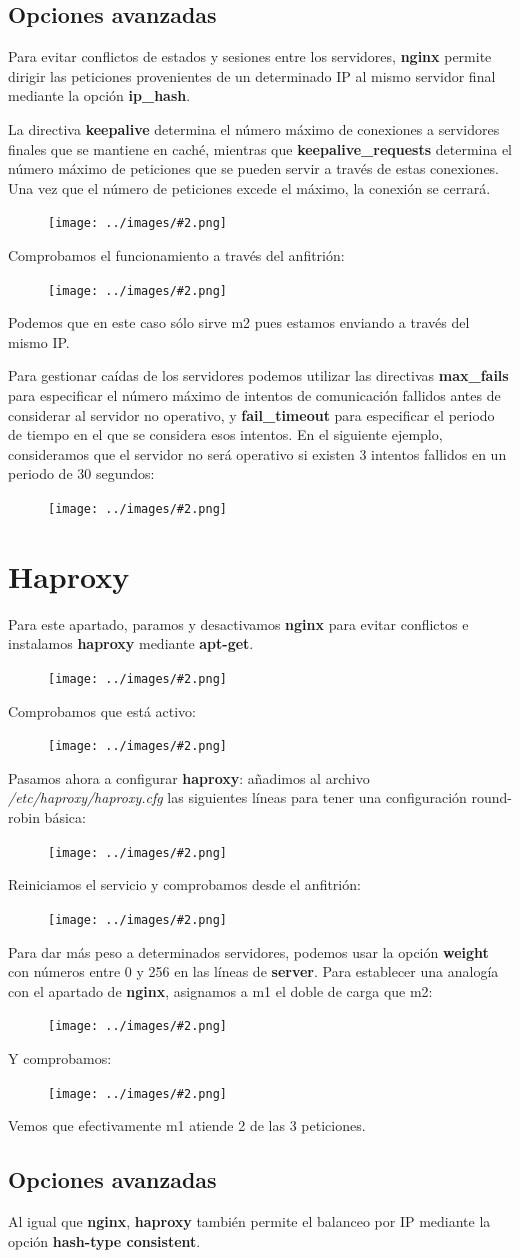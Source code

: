 \documentclass[twoside]{article}
\newcommand{\image}[2]{
\begin{figure}[H]
    \texttt{[image: ../images/\#2.png]}
    \centering
\end{figure}
}
\begin{document}
\subsection{Opciones avanzadas}
Para evitar conflictos de estados y sesiones entre los servidores, \textbf{nginx} permite dirigir las peticiones provenientes de un determinado IP al mismo servidor final mediante la opción \textbf{ip\_hash}. 

La directiva \textbf{keepalive} determina el número máximo de conexiones a servidores finales que se mantiene en caché, mientras que \textbf{keepalive\_requests} determina el número máximo de peticiones que se pueden servir a través de estas conexiones. Una vez que el número de peticiones excede el máximo, la conexión se cerrará.
\image{8}{12}
Comprobamos el funcionamiento a través del anfitrión:
\image{8}{13}
Podemos que en este caso sólo sirve m2 pues estamos enviando a través del mismo IP.

Para gestionar caídas de los servidores podemos utilizar las directivas \textbf{max\_fails} para especificar el número máximo de intentos de comunicación fallidos antes de considerar al servidor no operativo, y \textbf{fail\_timeout} para especificar el periodo de tiempo en el que se considera esos intentos. En el siguiente ejemplo, consideramos que el servidor no será operativo si existen 3 intentos fallidos en un periodo de 30 segundos:
\image{8}{14}


\section{Haproxy}
Para este apartado, paramos y desactivamos \textbf{nginx} para evitar conflictos e instalamos \textbf{haproxy} mediante \textbf{apt-get}.
\image{8}{15}
Comprobamos que está activo:
\image{8}{16}
Pasamos ahora a configurar \textbf{haproxy}: añadimos al archivo \textit{/etc/haproxy/haproxy.cfg} las siguientes líneas para tener una configuración round-robin básica:
\image{8}{17}
Reiniciamos el servicio y comprobamos desde el anfitrión:
\image{6}{18}
Para dar más peso a determinados servidores, podemos usar la opción \textbf{weight} con números entre 0 y 256 en las líneas de \textbf{server}. Para establecer una analogía con el apartado de \textbf{nginx}, asignamos a m1 el doble de carga que m2:
\image{8}{19}
Y comprobamos:
\image{6}{20}
Vemos que efectivamente m1 atiende 2 de las 3 peticiones.
\subsection{Opciones avanzadas}
Al igual que \textbf{nginx}, \textbf{haproxy} también permite el balanceo por IP mediante la opción \textbf{hash-type consistent}.
\end{document}
